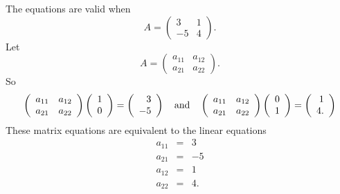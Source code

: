 \documentclass{ximera}
\begin{document}
\ans The equations are valid when
\[ A = \left(\begin{array}{rr} 3 & 1 \\ -5 & 4\end{array}\right). \]
\soln Let
\[ A = \left(\begin{array}{rr} a_{11} & a_{12} \\ a_{21} & 
a_{22}\end{array}\right). \]
So
\[ \left(\begin{array}{rr} a_{11} & a_{12} \\ a_{21} & a_{22}\end{array}\right)
\left(\begin{array}{r} 1 \\ 0\end{array}\right) =
\left(\begin{array}{r} 3 \\ -5\end{array}\right) \quad\mbox{and}\quad
\left(\begin{array}{rr} a_{11} & a_{12} \\ a_{21} & a_{22}\end{array}\right)
\left(\begin{array}{r} 0 \\ 1\end{array}\right) =
\left(\begin{array}{r} 1 \\ 4.\end{array}\right) \]
These matrix equations are equivalent to the linear equations
\[ \begin{array}{rcl}
a_{11} & = & 3 \\
a_{21} & = & -5 \\
a_{12} & = & 1 \\
a_{22} & = & 4.\end{array} \]
\end{document}
